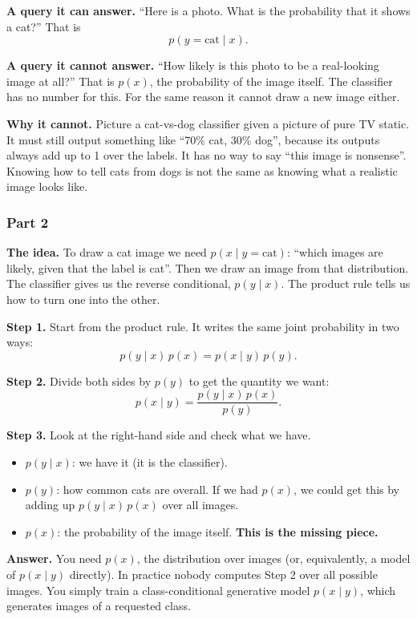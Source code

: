 \documentclass[12pt,a4paper]{article}
\begin{document}
\textbf{A query it can answer.} ``Here is a photo. What is the probability that it shows a cat?'' That is
\[
p(y = \text{cat} \mid x).
\]

\textbf{A query it cannot answer.} ``How likely is this photo to be a real-looking image at all?'' That is $p(x)$, the probability of the image itself. The classifier has no number for this. For the same reason it cannot draw a new image either.

\textbf{Why it cannot.} Picture a cat-vs-dog classifier given a picture of pure TV static. It must still output something like ``70\% cat, 30\% dog'', because its outputs always add up to 1 over the labels. It has no way to say ``this image is nonsense''. Knowing how to tell cats from dogs is not the same as knowing what a realistic image looks like.

\subsubsection{Part 2}

\textbf{The idea.} To draw a cat image we need $p(x \mid y = \text{cat})$: ``which images are likely, given that the label is cat''. Then we draw an image from that distribution. The classifier gives us the reverse conditional, $p(y \mid x)$. The product rule tells us how to turn one into the other.

\textbf{Step 1.} Start from the product rule. It writes the same joint probability in two ways:
\[
p(y \mid x)\, p(x) = p(x \mid y)\, p(y).
\]

\textbf{Step 2.} Divide both sides by $p(y)$ to get the quantity we want:
\[
p(x \mid y) = \frac{p(y \mid x)\, p(x)}{p(y)}.
\]

\textbf{Step 3.} Look at the right-hand side and check what we have.
\begin{itemize}[leftmargin=*]
\item $p(y \mid x)$: we have it (it is the classifier).
\item $p(y)$: how common cats are overall. If we had $p(x)$, we could get this by adding up $p(y \mid x)\,p(x)$ over all images.
\item $p(x)$: the probability of the image itself. \textbf{This is the missing piece.}
\end{itemize}

\textbf{Answer.} You need $p(x)$, the distribution over images (or, equivalently, a model of $p(x \mid y)$ directly). In practice nobody computes Step 2 over all possible images. You simply train a class-conditional generative model $p(x \mid y)$, which generates images of a requested class.
\end{document}
